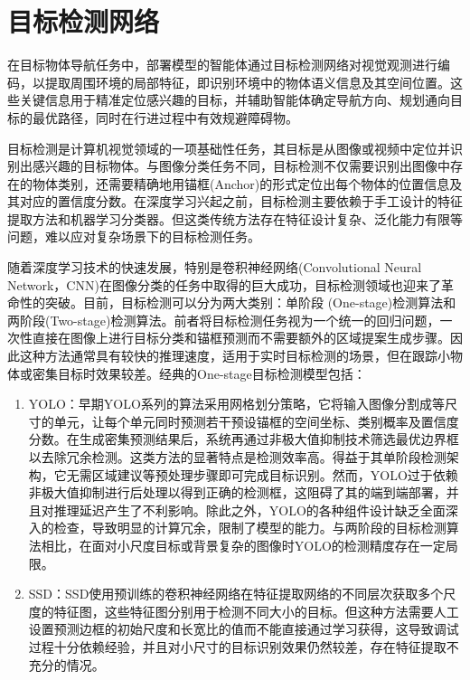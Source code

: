 \section{目标检测网络}
在目标物体导航任务中，部署模型的智能体通过目标检测网络对视觉观测进行编码，以提取周围环境的局部特征，即识别环境中的物体语义信息及其空间位置。这些关键信息用于精准定位感兴趣的目标，并辅助智能体确定导航方向、规划通向目标的最优路径，同时在行进过程中有效规避障碍物。

目标检测是计算机视觉领域的一项基础性任务，其目标是从图像或视频中定位并识别出感兴趣的目标物体。与图像分类任务不同，目标检测不仅需要识别出图像中存在的物体类别，还需要精确地用锚框(Anchor)的形式定位出每个物体的位置信息及其对应的置信度分数。在深度学习兴起之前，目标检测主要依赖于手工设计的特征提取方法和机器学习分类器\cite{viola2001rapid}。但这类传统方法存在特征设计复杂、泛化能力有限等问题，难以应对复杂场景下的目标检测任务。

随着深度学习技术的快速发展，特别是卷积神经网络(Convolutional Neural Network，CNN)\cite{taye2023theoretical}在图像分类的任务中取得的巨大成功，目标检测领域也迎来了革命性的突破。目前，目标检测可以分为两大类别：单阶段 (One-stage)检测算法和两阶段(Two-stage)检测算法。前者将目标检测任务视为一个统一的回归问题，一次性直接在图像上进行目标分类和锚框预测而不需要额外的区域提案生成步骤。因此这种方法通常具有较快的推理速度，适用于实时目标检测的场景，但在跟踪小物体或密集目标时效果较差。经典的One-stage目标检测模型包括：
\begin{enumerate}[topsep = 0 pt, itemsep= 0 pt, parsep=0pt, partopsep=0pt, leftmargin=44pt, itemindent=0pt, labelsep=6pt, label=(\arabic*)]
    \item 	YOLO\cite{redmon2016you}：早期YOLO系列的算法采用网格划分策略，它将输入图像分割成等尺寸的单元，让每个单元同时预测若干预设锚框的空间坐标、类别概率及置信度分数。在生成密集预测结果后，系统再通过非极大值抑制技术筛选最优边界框以去除冗余检测。这类方法的显著特点是检测效率高。得益于其单阶段检测架构，它无需区域建议等预处理步骤即可完成目标识别。然而，YOLO过于依赖非极大值抑制进行后处理以得到正确的检测框，这阻碍了其的端到端部署，并且对推理延迟产生了不利影响。除此之外，YOLO的各种组件设计缺乏全面深入的检查，导致明显的计算冗余，限制了模型的能力。与两阶段的目标检测算法相比，在面对小尺度目标或背景复杂的图像时YOLO的检测精度存在一定局限。
    \item	SSD\cite{liu2016ssd}：SSD使用预训练的卷积神经网络在特征提取网络的不同层次获取多个尺度的特征图，这些特征图分别用于检测不同大小的目标。但这种方法需要人工设置预测边框的初始尺度和长宽比的值而不能直接通过学习获得，这导致调试过程十分依赖经验，并且对小尺寸的目标识别效果仍然较差，存在特征提取不充分的情况。
\end{enumerate}

